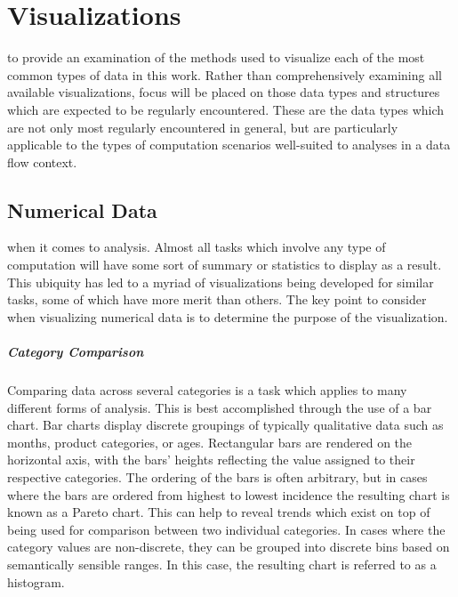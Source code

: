 \chapter{Visualizations}
\label{sec:visualizations}
 to provide an examination of the methods used to visualize each of the most common types of data in this work. Rather than comprehensively examining all available visualizations, focus will be placed on those data types and structures which are expected to be regularly encountered. These are the data types which are not only most regularly encountered in general, but are particularly applicable to the types of computation scenarios well-suited to analyses in a data flow context. 
 

\section{Numerical Data}
\label{sec:numerical_data}
 when it comes to analysis. Almost all tasks which involve any type of computation will have some sort of summary  or statistics to display as a result. This ubiquity has led to a myriad of visualizations being developed for similar tasks, some of which have more merit than others. The key point to consider when visualizing numerical data is to determine the purpose of the visualization. 

\paragraph{Category Comparison}
Comparing data across several categories is a task which applies to many different forms of analysis. This is best accomplished through the use of a bar chart. Bar charts display discrete groupings of typically qualitative data such as months, product categories, or ages. Rectangular bars are rendered on the horizontal axis, with the bars' heights reflecting the value assigned to their respective categories. The ordering of the bars is often arbitrary, but in cases where the bars are ordered from highest to lowest incidence the resulting chart is known as a Pareto chart. This can help to reveal trends which exist on top of being used for comparison between two individual categories. In cases where the category values are non-discrete, they can be grouped into discrete bins based on semantically sensible ranges. In this case, the resulting chart is referred to as a histogram.  

